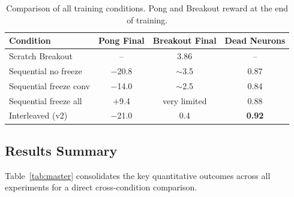 \documentclass[a4paper]{article}
\begin{document}
\begin{table}[H]
\centering
\caption{Comparison of all training conditions. Pong and Breakout reward at the end of
training.}
\label{tab:comparison}
\begin{tabular}{lccc}
\toprule
\textbf{Condition} & \textbf{Pong Final} & \textbf{Breakout Final} & \textbf{Dead Neurons} \\
\midrule
Scratch Breakout        & --      & 3.86 & -- \\
Sequential no freeze    & $-$20.8 & $\sim$3.5 & 0.87 \\
Sequential freeze conv  & $-$14.0 & $\sim$2.5 & 0.84 \\
Sequential freeze all   & $+$9.4  & very limited & 0.88 \\
Interleaved (v2)        & $-$21.0 & 0.4  & \textbf{0.92} \\
\bottomrule
\end{tabular}
\end{table}

\subsection{Results Summary}

Table~\ref{tab:master} consolidates the key quantitative outcomes across all experiments
for a direct cross-condition comparison.
\end{document}

